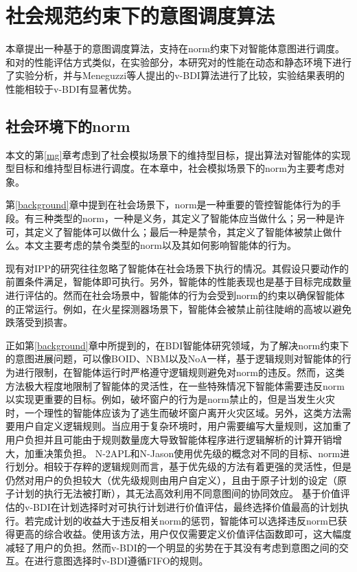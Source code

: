 \chapter{社会规范约束下的意图调度算法}\label{norm}
本章提出一种基于\SA 的意图调度算法\SAN ，\SAN 支持在norm约束下对智能体意图进行调度。和对\SAN 的性能评估方式类似，在实验部分，本研究对\SAN 的性能在动态和静态环境下进行了实验分析，并与Meneguzzi等人提出的v-BDI\cite{DBLP:journals/eaai/MeneguzziROVL15}算法进行了比较，实验结果表明\SAN 的性能相较于v-BDI有显著优势。
\section{社会环境下的norm}
本文的第\ref{mg}章考虑到了社会模拟场景下的维持型目标，提出\SAM 算法对智能体的实现型目标和维持型目标进行调度。在本章中，社会模拟场景下的norm为主要考虑对象。

第\ref{background}章中提到在社会场景下，norm是一种重要的管控智能体行为的手段\cite{DBLP:journals/mags/SavarimuthuC11}。有三种类型的norm，一种是义务，其定义了智能体应当做什么；另一种是许可，其定义了智能体可以做什么；最后一种是禁令，其定义了智能体被禁止做什么。本文主要考虑的禁令类型的norm以及其如何影响智能体的行为。

现有对IPP的研究往往忽略了智能体在社会场景下执行的情况。其假设只要动作的前置条件满足，智能体即可执行。另外，智能体的性能表现也是基于目标完成数量进行评估的。然而在社会场景中，智能体的行为会受到norm的约束以确保智能体的正常运行。例如，在火星探测器场景下，智能体会被禁止前往陡峭的高坡以避免跌落受到损害。

正如第\ref{background}章中所提到的，在BDI智能体研究领域，为了解决norm约束下的意图进展问题，可以像BOID\cite{DBLP:conf/agents/BroersenDHHT01}、NBM\cite{DBLP:conf/atal/MeneguzziL09}以及NoA\cite{DBLP:conf/ijcai/KollingbaumN03}一样，基于逻辑规则对智能体的行为进行限制，在智能体运行时严格遵守逻辑规则避免对norm的违反。然而，这类方法极大程度地限制了智能体的灵活性，在一些特殊情况下智能体需要违反norm以实现更重要的目标。例如，破坏窗户的行为是norm禁止的，但是当发生火灾时，一个理性的智能体应该为了逃生而破坏窗户离开火灾区域。另外，这类方法需要用户自定义逻辑规则。当应用于复杂环境时，用户需要编写大量规则，这加重了用户负担并且可能由于规则数量庞大导致智能体程序进行逻辑解析的计算开销增大，加重决策负担。
N-2APL\cite{DBLP:conf/aamas/AlechinaDL12}和N-Jason\cite{DBLP:conf/dalt/LeePLDA14}使用优先级的概念对不同的目标、norm进行划分。相较于存粹的逻辑规则而言，基于优先级的方法有着更强的灵活性，但是仍然对用户的负担较大（优先级规则由用户自定义），且由于原子计划的设定（原子计划的执行无法被打断），其无法高效利用不同意图间的协同效应。
基于价值评估的v-BDI\cite{DBLP:journals/eaai/MeneguzziROVL15}在计划选择时对可执行计划进行价值评估，最终选择价值最高的计划执行。若完成计划的收益大于违反相关norm的惩罚，智能体可以选择违反norm已获得更高的综合收益。使用该方法，用户仅仅需要定义价值评估函数即可，这大幅度减轻了用户的负担。然而v-BDI的一个明显的劣势在于其没有考虑到意图之间的交互。在进行意图选择时v-BDI遵循FIFO的规则。

